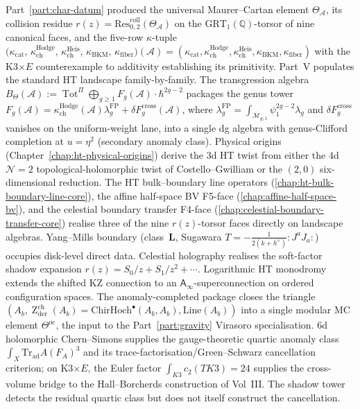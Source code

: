 \documentclass[11pt]{memoir}
\providecommand{\cref}[1]{\ref{#1}}
\newcommand{\cA}{\mathcal{A}}
\newcommand{\Q}{\mathbb{Q}}
\providecommand{\cN}{\mathcal{N}}
\providecommand{\cM}{\mathcal{M}}
\providecommand{\cM}{\mathcal{M}}
\newcommand{\Ainf}{\mathsf{A}_{\infty}}
\providecommand{\Zderch}{\operatorname{Z}^{\mathrm{ch}}_{\mathrm{der}}}
\providecommand{\bdyAlg}{A_{b}}
\providecommand{\bulkChirHoch}[1]{\mathrm{ChirHoch}^{\bullet}(#1, #1)}
\providecommand{\kappaCat}{\kappa_{\mathrm{cat}}}
\providecommand{\kappaChHodge}{\kappa_{\mathrm{ch}}^{\mathrm{Hodge}}}
\providecommand{\kappaChHeis}{\kappa_{\mathrm{ch}}^{\mathrm{Heis}}}
\providecommand{\kappaBKM}{\kappa_{\mathrm{BKM}}}
\providecommand{\kappaFiber}{\kappa_{\mathrm{fiber}}}
\providecommand{\kappaTuple}[1]{\bigl(\kappaCat,\, \kappaChHodge,\, \kappaChHeis,\, \kappaBKM,\, \kappaFiber\bigr)(#1)}
\begin{document}
\noindent
Part~\ref{part:char-datum} produced the universal Maurer--Cartan
element $\Theta_\cA$, its collision residue
$r(z) = \mathrm{Res}^{\mathrm{coll}}_{0,2}(\Theta_\cA)$ on
the $\mathrm{GRT}_1(\Q)$-torsor of nine canonical faces, and the
five-row $\kappa$-tuple
$\kappaTuple{\cA} = (\kappaCat, \kappaChHodge, \kappaChHeis, \kappaBKM, \kappaFiber)$
with the K3$\times E$ counterexample to additivity establishing
its primitivity. Part~V populates the standard HT landscape
family-by-family. The transgression
algebra $B_\Theta(\cA) := \operatorname{Tot}^\Pi
\bigoplus_{g \ge 1} F_g(\cA) \cdot \hbar^{2g-2}$ packages the
genus tower
$F_g(\cA) =
\kappaChHodge(\cA)\lambda_g^{\mathrm{FP}}
{}+\delta F_g^{\mathrm{cross}}(\cA)$, where
$\lambda_g^{\mathrm{FP}}
=\int_{\overline{\cM}_{g,1}}\psi_1^{2g-2}\lambda_g$
and $\delta F_g^{\mathrm{cross}}$ vanishes on the uniform-weight
lane, into a single dg algebra with genus-Clifford completion at
$u = \eta^2$ (secondary anomaly class). Physical origins
(Chapter~\ref{chap:ht-physical-origins}) derive the $3$d HT twist
from either the $4$d $\cN = 2$ topological-holomorphic twist of
Costello--Gwilliam or the $(2,0)$ six-dimensional reduction. The
HT bulk--boundary line operators
(\cref{chap:ht-bulk-boundary-line-core}), the affine half-space
BV F5-face (\cref{chap:affine-half-space-bv}), and the celestial
boundary transfer F4-face (\cref{chap:celestial-boundary-transfer-core})
realise three of the nine $r(z)$-torsor faces directly on landscape
algebras. Yang--Mills boundary (class~$\mathbf{L}$, Sugawara
$T = -\tfrac{1}{2(k+h^\vee)} :J^a J_a:$) occupies disk-level
direct data. Celestial holography realises the soft-factor
shadow expansion $r(z) = S_0/z + S_1/z^2 + \cdots$. Logarithmic
HT monodromy extends the shifted KZ connection to an
$\Ainf$-superconnection on ordered configuration spaces. The
anomaly-completed package closes the triangle
$(\bdyAlg, \Zderch(\bdyAlg) = \bulkChirHoch{\bdyAlg}, \mathrm{Line}(\bdyAlg))$
into a single modular MC element $\Theta^{\mathrm{oc}}$, the
input to the Part~\ref{part:gravity} Virasoro specialisation.
6d holomorphic Chern--Simons supplies the gauge-theoretic quartic
anomaly class $\int_X \mathrm{Tr}_{\mathrm{ad}} A (F_A)^3$ and its
trace-factorisation/Green--Schwarz cancellation criterion; on
K3$\times E$, the Euler factor
$\int_{K3}c_2(TK3)=24$ supplies the cross-volume bridge to the
Hall--Borcherds construction of Vol~III. The shadow tower detects the
residual quartic class but does not itself construct the cancellation.
\end{document}
